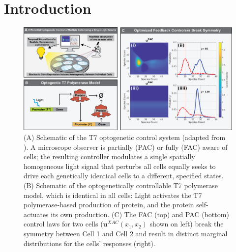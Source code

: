 \documentclass[12pt]{article}
\begin{document}
%
%
%
\maketitle
% 

\section{Introduction}
\begin{figure}
\begin{center}
\includegraphics[width=\columnwidth]{CartoonAndControler.png}
\caption{(A) Schematic of the T7 optogenetic control system (adapted from \cite{May2021}). A microscope observer is partially (PAC) or fully (FAC) aware  of cells; the resulting controller modulates a single spatially homogeneous light signal that perturbs all cells equally seeks to drive each genetically identical cells to a different, specified states. (B) Schematic of the optogenetically controllable T7 polymerase model, which is identical in all cells: Light activates the T7 polymerase-based production of protein, and the protein self-actuates its own production. (C) The FAC (top) and PAC (bottom) control laws for two cells ($\mathbf{u}^{XAC}(x_1,x_2)$ shown on left) break the symmetry between Cell 1 and Cell 2 and result in distinct marginal distributions for the cells' responses (right).}
\label{cartoons}
\end{center}
\vspace{-0.3in}
\end{figure}
\end{document}
